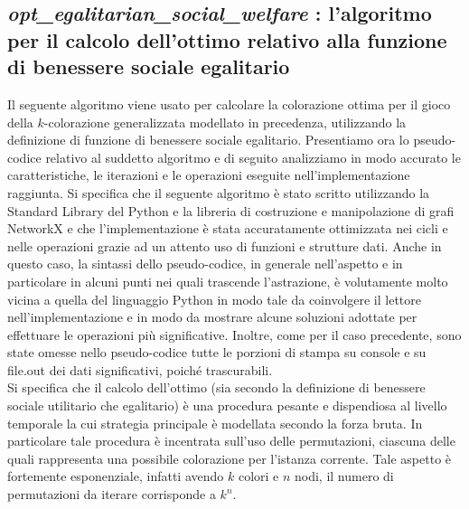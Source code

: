 \newpage
\subsection{\textit{opt\_egalitarian\_social\_welfare} : l'algoritmo per il calcolo dell'ottimo relativo alla funzione di benessere sociale egalitario}
\justify
Il seguente algoritmo viene usato per calcolare la colorazione ottima per il gioco della \(k\)-colorazione generalizzata modellato in precedenza, utilizzando la definizione di funzione di benessere sociale egalitario. Presentiamo ora lo pseudo-codice relativo al suddetto algoritmo e di seguito analizziamo in modo accurato le caratteristiche, le iterazioni e le operazioni eseguite nell'implementazione raggiunta. Si specifica che il seguente algoritmo è stato scritto utilizzando la Standard Library del Python e la libreria di costruzione e manipolazione di grafi NetworkX e che l'implementazione è stata accuratamente ottimizzata nei cicli e nelle operazioni grazie ad un attento uso di funzioni e strutture dati. Anche in questo caso, la sintassi dello pseudo-codice, in generale nell'aspetto e in particolare in alcuni punti nei quali trascende l'astrazione, è volutamente molto vicina a quella del linguaggio Python in modo tale da coinvolgere il lettore nell'implementazione e in modo da mostrare alcune soluzioni adottate per effettuare le operazioni più significative. Inoltre, come per il caso precedente, sono state omesse nello pseudo-codice tutte le porzioni di stampa su console e su file.out dei dati significativi, poiché trascurabili.\\
Si specifica che il calcolo dell'ottimo (sia secondo la definizione di benessere sociale utilitario che egalitario) è una procedura pesante e dispendiosa al livello temporale la cui strategia principale è modellata secondo la forza bruta. In particolare tale procedura è incentrata sull'uso delle permutazioni, ciascuna delle quali rappresenta una possibile colorazione per l'istanza corrente. Tale aspetto è fortemente esponenziale, infatti avendo \(k\) colori e \(n\) nodi, il numero di permutazioni da iterare corrisponde a \(k^n\).

